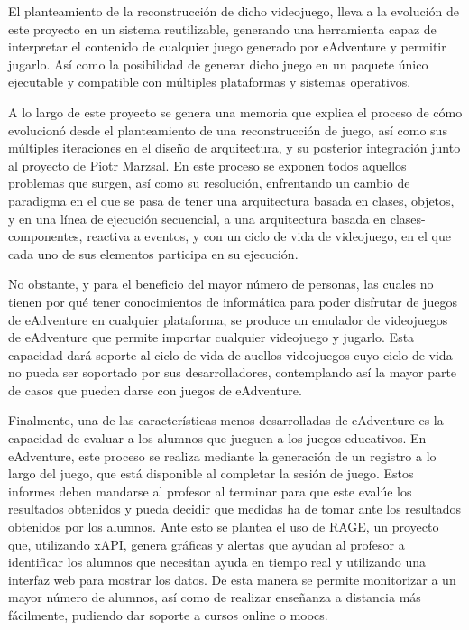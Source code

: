 El planteamiento de la reconstrucción de dicho videojuego, lleva a la evolución de este proyecto en un sistema reutilizable, generando una herramienta capaz de interpretar el contenido de cualquier juego generado por eAdventure y permitir jugarlo. Así como la posibilidad de generar dicho juego en un paquete único ejecutable y compatible con múltiples plataformas y sistemas operativos.

A lo largo de este proyecto se genera una memoria que explica el proceso de cómo evolucionó desde el planteamiento de una reconstrucción de juego, así como sus múltiples iteraciones en el diseño de arquitectura, y su posterior integración junto al proyecto de Piotr Marzsal. En este proceso se exponen todos aquellos problemas que surgen, así como su resolución, enfrentando un cambio de paradigma en el que se pasa de tener una arquitectura basada en clases, objetos, y en una línea de ejecución secuencial, a una arquitectura basada en clases-componentes, reactiva a eventos, y con un ciclo de vida de videojuego, en el que cada uno de sus elementos participa en su ejecución.

No obstante, y para el beneficio del mayor número de personas, las cuales no tienen por qué tener conocimientos de informática para poder disfrutar de juegos de eAdventure en cualquier plataforma, se produce un emulador de videojuegos de eAdventure que permite importar cualquier videojuego y jugarlo. Esta capacidad dará soporte al ciclo de vida de auellos videojuegos cuyo ciclo de vida no pueda ser soportado por sus desarrolladores, contemplando así la mayor parte de casos que pueden darse con juegos de eAdventure.

Finalmente, una de las características menos desarrolladas de eAdventure es la capacidad de evaluar a los alumnos que jueguen a los juegos educativos. En eAdventure, este proceso se realiza mediante la generación de un registro a lo largo del juego, que está disponible al completar la sesión de juego. Estos informes deben mandarse al profesor al terminar para que este evalúe los resultados obtenidos y pueda decidir que medidas ha de tomar ante los resultados obtenidos por los alumnos. Ante esto se plantea el uso de RAGE, un proyecto que, utilizando xAPI, genera gráficas y alertas que ayudan al profesor a identificar los alumnos que necesitan ayuda en tiempo real y utilizando una interfaz web para mostrar los datos. De esta manera se permite monitorizar a un mayor número de alumnos, así como de realizar enseñanza a distancia más fácilmente, pudiendo dar soporte a cursos online o moocs.


